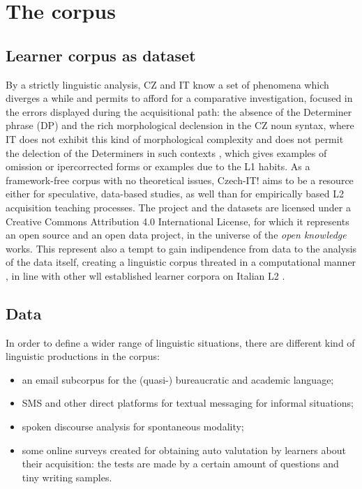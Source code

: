 \documentclass[a4paper,twoside,11pt,chapterprefix=true,listof=totocnumbered,bibliography=totocnumbered]{scrbook}
\providecommand{\tightlist}{%
  \setlength{\itemsep}{0pt}\setlength{\parskip}{0pt}}
\theoremstyle{definition}
\theoremstyle{definition}
\theoremstyle{definition}
\theoremstyle{remark}
\begin{document}
\section{The corpus}\label{the-corpus}

\subsection{Learner corpus as dataset}\label{learner-corpus-as-dataset}

By a strictly linguistic analysis, CZ and IT know a set of phenomena
which diverges a while and permits to afford for a comparative
investigation, focused in the errors displayed during the acquisitional
path: the absence of the Determiner phrase (DP) and the rich
morphological declension in the CZ noun syntax, where IT does not
exhibit this kind of morphological complexity and does not permit the
delection of the Determiners in such contexts
\citep[\citet{longobardi-n_movement}]{bianchi-1992}, which gives
examples of omission or ipercorrected forms or examples due to the L1
habits. As a framework-free corpus with no theoretical issues, Czech-IT!
aims to be a resource either for speculative, data-based studies, as
well than for empirically based L2 acquisition teaching processes. The
project and the datasets are licensed under a Creative Commons
Attribution 4.0 International License, for which it represents an open
source and an open data project, in the universe of the \emph{open
knowledge} works. This represent also a tempt to gain indipendence from
data to the analysis of the data itself, creating a linguistic corpus
threated in a computational manner
\citep[\citet{kuebler-corpus_linguistics}, \citet{schmid-treetagger},
\citet{bird-nltk}, \citet{kurdi_natural_2016-2},
\citet{clark_handbook_2010-1}]{abney1997}, in line with other wll
established learner corpora on Italian L2 \citep[\citet{lips}]{valico}.

\subsection{Data}\label{data}

In order to define a wider range of linguistic situations, there are
different kind of linguistic productions in the corpus:

\begin{itemize}
\tightlist
\item
  an email subcorpus for the (quasi-) bureaucratic and academic
  language;
\item
  SMS and other direct platforms for textual messaging for informal
  situations;
\item
  spoken discourse analysis for spontaneous modality;
\item
  some online surveys created for obtaining auto valutation by learners
  about their acquisition: the tests are made by a certain amount of
  questions and tiny writing samples.
\end{itemize}
\end{document}
